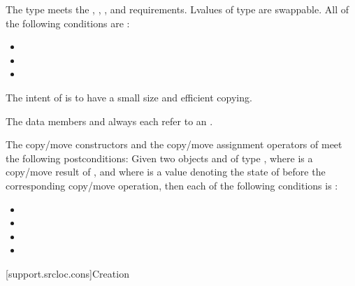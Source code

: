 \pnum
The type  meets the
,
,
, and
requirements.
Lvalues of type 
are swappable.
All of the following conditions are :
\begin{itemize}
\item {}
\item {}
\item {}
\end{itemize}
\begin{note}
The intent of  is
to have a small size and efficient copying.
\end{note}

\pnum
The data members  and 
always each refer to an \ntbs{}.

\pnum
The copy/move constructors and the copy/move assignment operators of
 meet the following postconditions:
Given two objects   and  of type ,
where  is a copy/move result of , and
where  is a value denoting the state of 
before the corresponding copy/move operation,
then each of the following conditions is :
\begin{itemize}
\item {}
\item {}
\item {}
\item {}
\end{itemize}

[support.srcloc.cons]{Creation}

